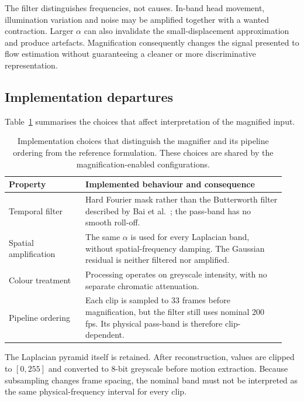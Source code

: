 The filter distinguishes frequencies, not causes. In-band head movement, illumination variation and noise may be amplified together with a wanted contraction. Larger $\alpha$ can also invalidate the small-displacement approximation and produce artefacts. Magnification consequently changes the signal presented to flow estimation without guaranteeing a cleaner or more discriminative representation.

\subsection{Implementation departures}
\label{sec:evm-departures}

Table~\ref{tab:ch2-evm-departures} summarises the choices that affect interpretation of the magnified input.

\begin{table}[htbp]
    \centering
    \small
    \begin{tabular}{@{}p{0.26\linewidth} p{0.68\linewidth}@{}}
        \hline
        \textbf{Property} & \textbf{Implemented behaviour and consequence} \\
        \hline
        Temporal filter & Hard Fourier mask rather than the Butterworth filter described by Bai et al.~\cite{bai2021}; the pass-band has no smooth roll-off. \\
        Spatial amplification & The same $\alpha$ is used for every Laplacian band, without spatial-frequency damping. The Gaussian residual is neither filtered nor amplified. \\
        Colour treatment & Processing operates on greyscale intensity, with no separate chromatic attenuation. \\
        Pipeline ordering & Each clip is sampled to 33 frames before magnification, but the filter still uses nominal 200 fps. Its physical pass-band is therefore clip-dependent. \\
        \hline
    \end{tabular}
    \caption[EVM implementation departures]{Implementation choices that distinguish the magnifier and its pipeline ordering from the reference formulation. These choices are shared by the magnification-enabled configurations.}
    \label{tab:ch2-evm-departures}
\end{table}

The Laplacian pyramid itself is retained. After reconstruction, values are clipped to $[0,255]$ and converted to 8-bit greyscale before motion extraction. Because subsampling changes frame spacing, the nominal band must not be interpreted as the same physical-frequency interval for every clip.

